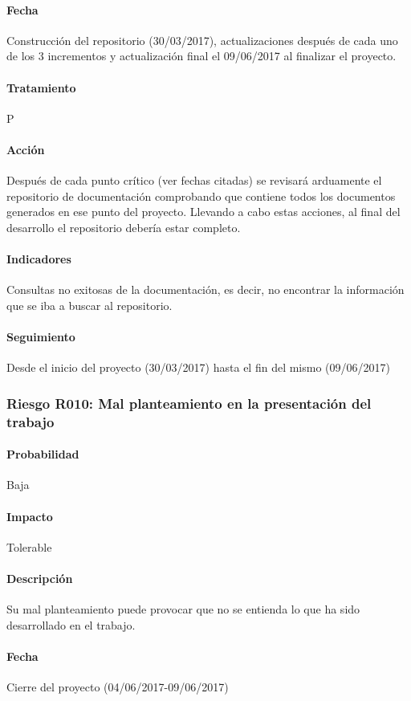 \documentclass[10pt,a4paper]{article}
\begin{document}
				\paragraph{Fecha} Construcción del repositorio (30/03/2017), actualizaciones después de cada uno de los 3 incrementos y actualización final el 09/06/2017 al finalizar el proyecto.
				\paragraph{Tratamiento} P
				\paragraph{Acción} Después de cada punto crítico (ver fechas citadas) se revisará arduamente el repositorio de documentación comprobando que contiene todos los documentos generados en ese punto del proyecto.	Llevando a cabo estas acciones, al final del desarrollo el repositorio debería estar completo.			
				\paragraph{Indicadores} Consultas no exitosas de la documentación, es decir, no encontrar la información que se iba a buscar al repositorio.
				\paragraph{Seguimiento}	Desde el inicio del proyecto (30/03/2017) hasta el fin del mismo (09/06/2017)
				
			\subsubsection{Riesgo R010: Mal planteamiento en la presentación del trabajo}
				\paragraph{Probabilidad} Baja
				\paragraph{Impacto}	Tolerable
				\paragraph{Descripción} Su mal planteamiento puede provocar que no se entienda lo que ha sido desarrollado en el trabajo. 
				\paragraph{Fecha} Cierre del proyecto (04/06/2017-09/06/2017)
\end{document}
